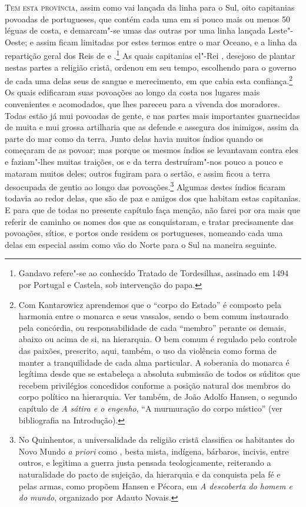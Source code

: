 \noindent\textsc{Tem esta província}, assim como vai lançada da linha  para o Sul,
oito capitanias povoadas de portugueses, que contém cada uma em si
pouco mais ou menos 50 léguas de costa, e demarcam"-se umas das
outras por uma linha lançada Leste"-Oeste; e assim ficam limitadas por
estes termos entre o mar Oceano, e a linha da repartição geral dos Reis
de  e .\footnote{ Gandavo refere"-se ao conhecido Tratado
de Tordesilhas, assinado em 1494 por Portugal e Castela, sob
intervenção do papa.} As quais capitanias el"-Rei ,		
desejoso de plantar nestas partes a religião cristã, ordenou em seu
tempo, escolhendo para o governo de cada uma delas  seus de
sangue e merecimento, em que cabia esta confiança.\footnote{ Com
Kantarowicz aprendemos que o ``corpo do
Estado'' é composto pela harmonia entre o monarca e seus
vassalos, sendo o bem comum instaurado pela concórdia, ou
responsabilidade de cada ``membro'' perante
os demais, abaixo ou acima de si, na hierarquia. O bem comum é regulado pelo
controle das paixões, prescrito, aqui, também, o uso da violência como
forma de manter a tranquilidade de cada alma particular. A soberania do monarca é
legítima desde que se estabeleça a absoluta submissão de todos os súditos que recebem
privilégios concedidos conforme a posição natural dos membros do corpo
político na hierarquia. Ver também, de João Adolfo Hansen, o segundo
capítulo de \textit{A sátira e o engenho}, ``A murmuração
do corpo místico'' (ver bibliografia na Introdução).} Os quais 
edificaram suas povoações ao longo da costa nos lugares mais
convenientes e acomodados, que lhes pareceu para a vivenda dos
moradores. Todas estão já mui povoadas de gente, e nas partes mais
importantes guarnecidas de muita e mui grossa artilharia que as defende
e assegura dos inimigos, assim da parte do mar como da terra. Junto
delas havia muitos índios quando os  começaram de as			%
povoar; mas porque os mesmos índios se levantavam contra eles e
faziam"-lhes muitas traições, os  e  da terra
destruíram"-nos pouco a pouco e mataram muitos deles; outros fugiram
para o sertão, e assim ficou a terra desocupada de gentio ao longo das				%
povoações.\footnote{ No Quinhentos, a universalidade da religião cristã
classifica os habitantes do Novo Mundo \textit{a priori} como ,
besta mista, indígena, bárbaros, incivis, entre outros, e legitima a
guerra justa pensada  teologicamente, reiterando a naturalidade do
pacto de sujeição, da hierarquia e da conquista pela fé e pelas armas,
como propõem Hansen e Pécora, em \textit{A descoberta do homem e do
mundo}, organizado por Adauto Novais.}
 Algumas  destes índios									%
ficaram todavia ao redor delas, que são de paz e amigos dos 
que habitam estas capitanias. E para que de todas no presente capítulo
faça menção, não farei por ora mais que referir de caminho os nomes dos
 que as conquistaram, e tratar precisamente das
povoações, sítios, e portos onde residem os portugueses, nomeando cada
uma delas em especial assim como vão do Norte para o Sul na maneira seguinte.


